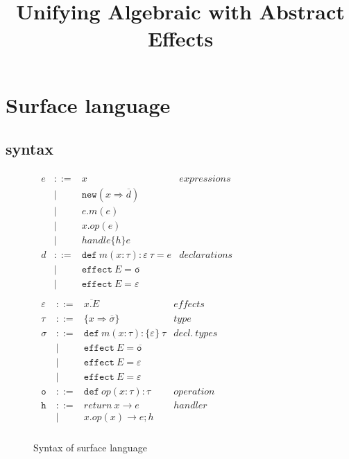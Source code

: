 \documentclass{article}
\newcommand{\keywadj}[1]{\mathtt{#1}}
\newcommand{\keyw}[1]{\keywadj{#1}~}
\begin{document}
\title{Unifying Algebraic with Abstract Effects}
\maketitle


\section{Surface language}
\subsection{syntax}
\begin{figure}[H]
\small{
\[
\begin{array}{lll}
\begin{array}{lllr}
e & ::= & x & \mathit{expressions}\\
& | & \keywadj{new}(x \Rightarrow \overline{d}) \\
& | & e.m(e)\\
& | & x.op(e)\\
& | & handle \{ h \} e\\
d & ::= & \keyw{def} m(x : \tau) :  \varepsilon ~\tau = e &
\mathit{declarations}\\
& |   & \keyw{effect} E = \overline{\keyw{o}} \\
& |   & \keyw{effect} E = \varepsilon \\

\end{array}
\begin{array}{lllr}
\varepsilon & ::= & \overline{x.E} & \mathit{effects}\\
\tau & ::= & \{ x \Rightarrow \overline{\sigma} \} & \mathit{type}\\
\sigma & ::= & \keyw{def} m(x : \tau) : \{\varepsilon\} ~\tau & \mathit{decl.~types}\\
       & |   & \keyw{effect} E = \overline{\keyw{o}}\\
       & |   & \keyw{effect} E = \varepsilon \\
       & |   & \keyw{effect} E = \varepsilon \\
\keyw{o} & ::= & \keyw{def} op(x:\tau):  \tau & \mathit{operation}\\
\keyw{h} & ::= & return\ x \rightarrow e & \mathit{handler}\\
& | & x.op(x) \rightarrow e; h\\
\
\end{array}
\end{array}
\]
}
\caption{Syntax of surface language}
\end{figure}
\end{document}
